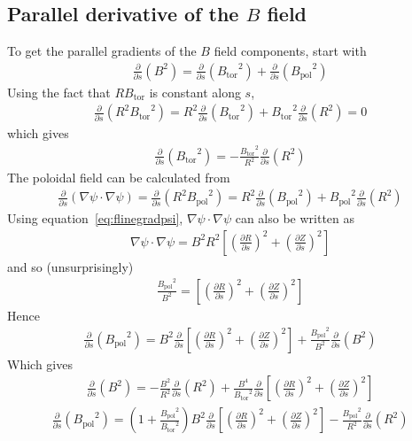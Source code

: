 \documentclass[12pt]{article}
\newcommand{\deriv}[2]{\ensuremath{\frac{\partial #1}{\partial #2}}}
\newcommand{\Bp}{\ensuremath{B_{\text{pol}}}}
\newcommand{\Bt}{\ensuremath{B_{\text{tor}}}}
\begin{document}
\subsection{Parallel derivative of the \texorpdfstring{$B$}{B} field}
%
To get the parallel gradients of the $B$ field components, start with
%
\begin{align*}
\deriv{}{s}\left(B^2\right) = \deriv{}{s}\left(\Bt^2\right) +
\deriv{}{s}\left(\Bp^2\right)
\end{align*}
%
Using the fact that $R\Bt$ is constant along $s$,
%
\begin{align*}
\deriv{}{s}\left(R^2\Bt^2\right) = R^2\deriv{}{s}\left(\Bt^2\right) +
\Bt^2\deriv{}{s}\left(R^2\right) = 0
\end{align*}
%
which gives
%
\begin{align*}
  \deriv{}{s}\left(\Bt^2\right) = -\frac{\Bt^2}{R^2}\deriv{}{s}\left(R^2\right)
\end{align*}
%
The poloidal field can be calculated from
%
\begin{align*}
\deriv{}{s}\left(\nabla\psi \cdot \nabla\psi\right) =
\deriv{}{s}\left(R^2\Bp^2\right) = R^2\deriv{}{s}\left(\Bp^2\right) +
\Bp^2\deriv{}{s}\left(R^2\right)
\end{align*}
%
Using equation~\ref{eq:flinegradpsi}, $\nabla\psi \cdot \nabla\psi$ can also be
written as
%
\begin{align*}
\nabla\psi \cdot \nabla\psi = B^2R^2\left[\left(\deriv{R}{s}\right)^2 +
\left(\deriv{Z}{s}\right)^2\right]
\end{align*}
%
and so (unsurprisingly)
%
\begin{align*}
\frac{\Bp^2}{B^2} = \left[\left(\deriv{R}{s}\right)^2 +
\left(\deriv{Z}{s}\right)^2\right]
\end{align*}
%
Hence
%
\begin{align*}
\deriv{}{s}\left(\Bp^2\right) = B^2\deriv{}{s}\left[\left(\deriv{R}{s}\right)^2
+ \left(\deriv{Z}{s}\right)^2\right] +
\frac{\Bp^2}{B^2}\deriv{}{s}\left(B^2\right)
\end{align*}
%
Which gives
%
\begin{align*}
\deriv{}{s}\left(B^2\right) = -\frac{B^2}{R^2}\deriv{}{s}\left(R^2\right) +
\frac{B^4}{\Bt^2}\deriv{}{s}\left[\left(\deriv{R}{s}\right)^2 +
\left(\deriv{Z}{s}\right)^2\right]
\end{align*}
%
\begin{align*}
\deriv{}{s}\left(\Bp^2\right) = \left(1 +
\frac{\Bp^2}{\Bt^2}\right)B^2\deriv{}{s}\left[\left(\deriv{R}{s}\right)^2 +
\left(\deriv{Z}{s}\right)^2\right] -
\frac{\Bp^2}{R^2}\deriv{}{s}\left(R^2\right)
\end{align*}
%
\end{document}
